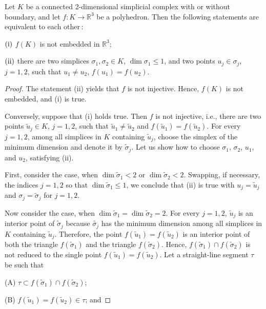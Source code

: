 \documentclass[10pt,a4paper]{amsart}
\begin{document}
\begin{lemma}\label{lemma1}
Let 
$K$ 
be a connected 2-dimensional simplicial complex with or without boundary, and let 
$f: K\to\mathbb{R}^3$ 
be a polyhedron.
Then the following statements are equivalent to each other\,$:$ 
\par
$(\mbox{\emph{i}})$ $f(K)$
is not embedded in 
$\mathbb{R}^3;$
\par
$(\mbox{\emph{ii}})$ there are two simplices 
$\sigma_1, \sigma_2\in K$, $\dim\sigma_1\leqslant 1$,
and two points 
$u_j\in\sigma_j$, $j=1,2$,
such that 
$u_1\neq u_2$, $f(u_1)=f(u_2)$.
\end{lemma}

\begin{proof}
The statement (ii) yields that
$f$ 
is not injective. 
Hence, 
$f(K)$ 
is not embedded, and (i) is true.

Conversely, suppose that (i) holds true.
Then
$f$ 
is not injective, i.e., there are two points 
$\widetilde{u}_j\in K$, $j=1,2$,
such that 
$\widetilde{u}_1\neq \widetilde{u}_2$ 
and 
$f(\widetilde{u}_1)=f(\widetilde{u}_2)$.
For every 
$j=1,2$, 
among all simplices in 
$K$
containing  
$\widetilde{u}_j$,
choose the simplex of the minimum dimension and denote it by 
$\widetilde{\sigma}_j$.
Let us show how to choose
$\sigma_1$, $\sigma_2$, $u_1$, and $u_2$, 
satisfying (ii).

First, consider the case, when 
$\dim \widetilde{\sigma}_1<2$
or 
$\dim \widetilde{\sigma}_2<2$.
Swapping, if necessary, the indices 
$j=1,2$ 
so that 
$\dim\widetilde{\sigma}_1\leqslant 1$, 
we conclude that (ii) is true with
$u_j=\widetilde{u}_j$
and
$\sigma_j=\widetilde{\sigma}_j$
for 
$j=1,2$.

Now consider the case, when 
$\dim\widetilde{\sigma}_1=\dim\widetilde{\sigma}_2=2$.
For every 
$j=1,2$, 
$\widetilde{u}_j$
is an interior point of
$\widetilde{\sigma}_j$ 
because
$\widetilde{\sigma_j}$
has the minimum dimension among all simplices in 
$K$
containing  
$\widetilde{u}_j$.
Therefore, the point 
$f(\widetilde{u}_1)=f(\widetilde{u}_2)$ 
is an interior point of both the triangle 
$f(\widetilde{\sigma}_1)$ 
and the triangle 
$f(\widetilde{\sigma}_2)$.
Hence, 
$f(\widetilde{\sigma}_1)\cap f(\widetilde{\sigma}_2)$
is not reduced to the single point
$f(\widetilde{u}_1)=f(\widetilde{u}_2)$.
Let a straight-line segment 
$\tau$
be such that 

(A) 
$\tau\subset f(\widetilde{\sigma}_1)\cap f(\widetilde{\sigma}_2)$;

(B) 
$f(\widetilde{u}_1)=f(\widetilde{u}_2)\in \tau$;  
and 


\end{proof}
\end{document}
